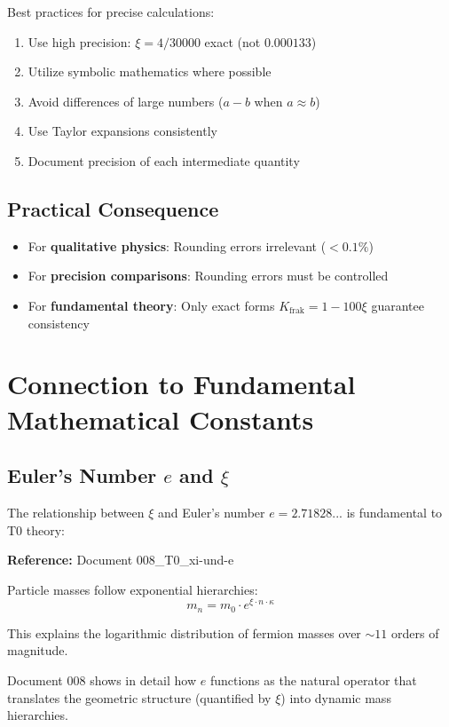 	Best practices for precise calculations:
	\begin{enumerate}
		\item Use high precision: $\xi = 4/30000$ exact (not $0.000133$)
		\item Utilize symbolic mathematics where possible
		\item Avoid differences of large numbers ($a - b$ when $a \approx b$)
		\item Use Taylor expansions consistently
		\item Document precision of each intermediate quantity
	\end{enumerate}
	
	\subsection{Practical Consequence}
	
	\begin{itemize}
		\item For \textbf{qualitative physics}: Rounding errors irrelevant ($< 0.1\%$)
		\item For \textbf{precision comparisons}: Rounding errors must be controlled
		\item For \textbf{fundamental theory}: Only exact forms $K_{\text{frak}} = 1 - 100\xi$ guarantee consistency
	\end{itemize}
	
	\section{Connection to Fundamental Mathematical Constants}
	
	\subsection{Euler's Number $e$ and $\xi$}
	
	The relationship between $\xi$ and Euler's number $e = 2.71828...$ is fundamental to T0 theory:
	
	\begin{tcolorbox}[colback=cyan!5!white,colframe=cyan!75!black,title={Exponential Forms in T0}]
		\textbf{Reference:} Document 008\_T0\_xi-und-e
		
		Particle masses follow exponential hierarchies:
		\begin{equation}
			m_n = m_0 \cdot e^{\xi \cdot n \cdot \kappa}
		\end{equation}
		
		This explains the logarithmic distribution of fermion masses over $\sim 11$ orders of magnitude.
		
		Document 008 shows in detail how $e$ functions as the natural operator that translates the geometric structure (quantified by $\xi$) into dynamic mass hierarchies.
	\end{tcolorbox}
	
